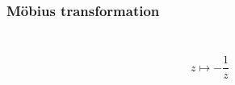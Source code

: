 \documentclass[aspectratio=169]{beamer}
\begin{document}
\begin{frame}
    \frametitle{Möbius transformation}
    \begin{columns}
        \begin{column}{0.5\textwidth}
            \begin{figure}[ht]\centering
            \end{figure}
        \end{column}
        \begin{column}{0.5\textwidth}
            \begin{figure}[ht]\centering
            \end{figure}
        \end{column}
    \end{columns}
    \begin{center}
        \[
            z \mapsto - \frac{1}{z}
        \]
    \end{center}
\end{frame}
\end{document}
